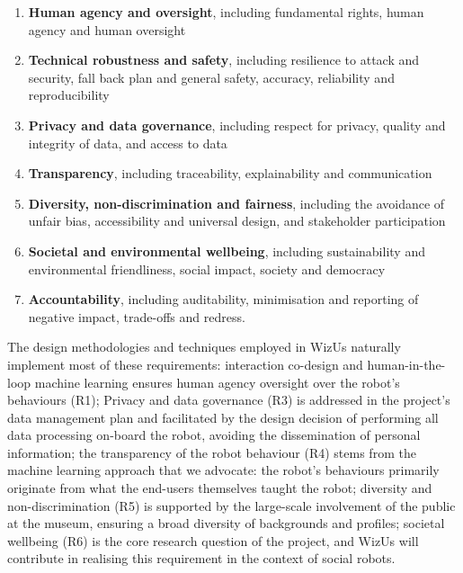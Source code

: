 \documentclass[11pt,a4paper]{report}
\newcommand{\project}{WizUs\xspace}
\begin{document}
\begin{enumerate}[label=\textbf{R\arabic*}]
    \item \textbf{Human agency and oversight}, including
            fundamental rights, human agency and human oversight

    \item \textbf{Technical robustness and safety}, including resilience to
        attack and security, fall back plan and general safety, accuracy,
        reliability and reproducibility

    \item \textbf{Privacy and data governance}, including respect for privacy,
        quality and integrity of data, and access to data

    \item \textbf{Transparency}, including traceability, explainability and
        communication

    \item \textbf{Diversity, non-discrimination and fairness}, including the
        avoidance of unfair bias, accessibility and universal design, and
        stakeholder participation

    \item \textbf{Societal and environmental wellbeing}, including
        sustainability and environmental friendliness, social impact, society
        and democracy

    \item \textbf{Accountability}, including auditability, minimisation and
        reporting of negative impact, trade-offs and redress.

\end{enumerate}

The design methodologies and techniques employed in \project naturally implement
most of these requirements: interaction co-design and human-in-the-loop machine
learning ensures human agency oversight over the robot's behaviours (R1);
Privacy and data governance (R3) is addressed in the project's data management
plan and facilitated by the design decision of performing all data processing
on-board the robot, avoiding the dissemination of personal information; the
transparency of the robot behaviour (R4) stems from the machine learning
approach that we advocate: the robot's behaviours primarily originate from what
the end-users themselves taught the robot; diversity and non-discrimination (R5)
is supported by the large-scale involvement of the public at the museum,
ensuring a broad diversity of backgrounds and profiles; societal wellbeing (R6)
is the core research question of the project, and \project will contribute in
realising this requirement in the context of social robots.
\end{document}

